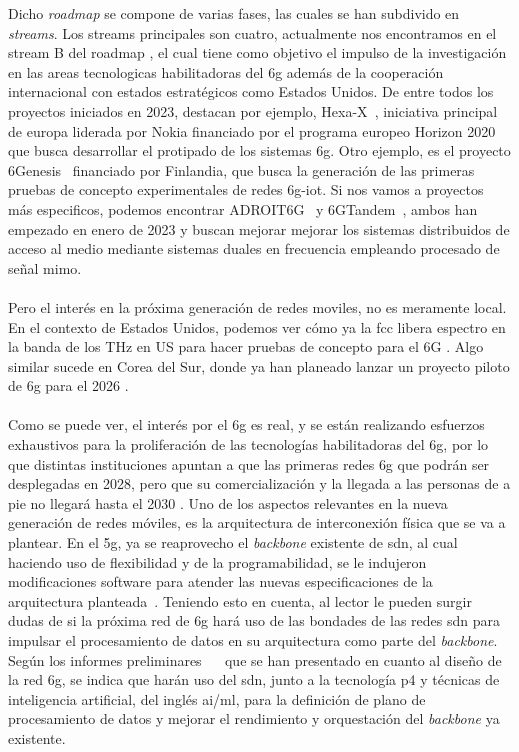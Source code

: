 Dicho \textit{roadmap} se compone de varias fases, las cuales se han subdivido en \textit{streams}. Los streams principales son cuatro, actualmente nos encontramos en el stream B del roadmap \cite{eu6GFase2}, el cual tiene como objetivo el impulso de la investigación en las areas tecnologicas habilitadoras del \gls{6g} además de la cooperación internacional con estados estratégicos como Estados Unidos. De entre todos los proyectos iniciados en 2023, destacan por ejemplo, Hexa-X~\cite{9482430}, iniciativa principal de europa liderada por Nokia financiado por el programa europeo Horizon 2020 que busca desarrollar el protipado de los sistemas \gls{6g}. Otro ejemplo, es el proyecto 6Genesis~\cite{Katz2019} financiado por Finlandia, que busca la generación de las primeras pruebas de concepto experimentales de redes \gls{6g}-\gls{iot}. Si nos vamos a proyectos más especificos, podemos encontrar ADROIT6G~\cite{ADROIT6G} y 6GTandem~\cite{6GTandem}, ambos han empezado en enero de 2023 y buscan mejorar mejorar los sistemas distribuidos de acceso al medio mediante sistemas duales en frecuencia empleando procesado de señal \gls{mimo}.\\
\\
Pero el interés en la próxima generación de redes moviles, no es meramente local. En el contexto de Estados Unidos, podemos ver cómo ya la \gls{fcc} libera espectro en la banda de los THz en US para hacer pruebas de concepto para el 6G \cite{us6g}. Algo similar sucede en Corea del Sur, donde ya han planeado lanzar un proyecto piloto de \gls{6g} para el 2026 \cite{coreaSur6G}.\\
\\
Como se puede ver, el interés por el \gls{6g} es real, y se están realizando esfuerzos exhaustivos para la proliferación de las tecnologías habilitadoras del \gls{6g}, por lo que distintas instituciones apuntan a que las primeras redes \gls{6g} que podrán ser desplegadas en 2028, pero que su comercialización y la llegada a las personas de a pie no llegará hasta el 2030 \cite{Nguyen2022}. Uno de los aspectos relevantes en la nueva generación de redes móviles, es la arquitectura de interconexión física que se va a plantear. En el \gls{5g}, ya se reaprovecho el \textit{backbone} existente de \gls{sdn}, al cual haciendo uso de flexibilidad y de la programabilidad,  se le indujeron modificaciones software para atender las nuevas especificaciones de la arquitectura planteada~\cite{Li2018}. Teniendo esto en cuenta, al lector le pueden surgir dudas de si la próxima red de \gls{6g} hará uso de las bondades de las redes \gls{sdn} para impulsar el procesamiento de datos en su arquitectura como parte del \textit{backbone}. Según los informes preliminares \cite{Uusitalo2021}~\cite{6garch1}~\cite{6garch2} que se han presentado en cuanto al diseño de la red \gls{6g}, se indica que harán uso del \gls{sdn},  junto a la tecnología \gls{p4} y técnicas de inteligencia artificial, del inglés \gls{ai}/\gls{ml}, para la definición de plano de procesamiento de datos y mejorar el rendimiento y orquestación del \textit{backbone} ya existente.\\


